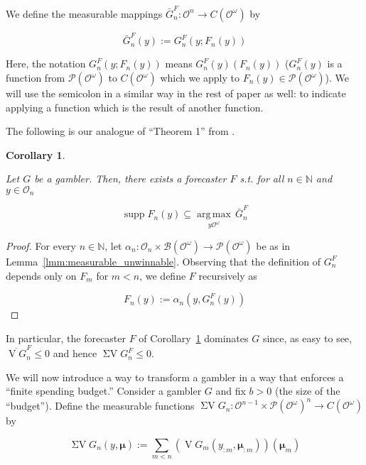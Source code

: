 \documentclass[aop,preprint]{imsart}
\numberwithin{equation}{section}
\theoremstyle{definition}
\theoremstyle{plain}
\newtheorem{corollary}{Corollary}[section]
\newcommand{\Nats}{\mathbb{N}}
\newcommand{\Argmax}[1]{\underset{#1}{\operatorname{arg\,max}}\,}
\newcommand{\PM}{\mathcal{P}}
\DeclareMathOperator{\Sp}{supp}
\newcommand{\Ob}{\mathcal{O}}
\newcommand{\OO}{\Ob^\omega}
\newcommand{\PMO}{\PM(\OO)}
\newcommand{\Gm}{\mathcal{B}}
\newcommand{\GMO}{\Gm(\OO)}
\newcommand{\CO}{C(\OO)}
\DeclareMathOperator{\V}{V}
\DeclareMathOperator{\SV}{\Sigma V}
\newcommand{\BM}{\bm{\mu}}
\begin{document}
We define the measurable mappings $\bar{G}^F_n: \Ob^n \rightarrow \CO$ by

\begin{equation}
\bar{G}^F_n\left(y\right) := G^F_n\left(y;F_n\left(y\right)\right)
\end{equation}

Here, the notation $G^F_n\left(y;F_n\left(y\right)\right)$ means $G^F_n(y)\left(F_n\left(y\right)\right)$ ($G^F_n(y)$ is a function from $\PMO$ to $\CO$ which we apply to $F_n\left(y\right)\in\PMO$). We will use the semicolon in a similar way in the rest of paper as well: to indicate applying a function which is the result of another function.

The following is our analogue of \enquote{Theorem 1} from \cite{Vovk_2005}.

\begin{corollary}
\label{crl:dominate_one}

Let $G$ be a gambler. Then, there exists a forecaster $F$ s.t. for all $n \in \Nats$ and $y \in \Ob_n$

\begin{equation}
\Sp F_n\left(y\right) \subseteq \Argmax{y\OO} \bar{G}^F_n
\end{equation}

\end{corollary}

\begin{proof}

For every $n \in \Nats$, let $\alpha_n: \Ob_n \times \GMO \rightarrow \PMO$ be as in Lemma~\ref{lmm:measurable_unwinnable}. Observing that the definition of $G^F_n$ depends only on $F_m$ for $m < n$, we define $F$ recursively as

\[F_n\left(y\right):=\alpha_n\left(y,G^F_n\left(y\right)\right)\]
\end{proof}

In particular, the forecaster $F$ of Corollary~\ref{crl:dominate_one} dominates $G$ since, as easy to see, $\overline{\V G}^F_n \leq 0$ and hence $\SV G^F_n \leq 0$.

We will now introduce a way to transform a gambler in a way that enforces a \enquote{finite spending budget.} Consider a gambler $G$ and fix $b > 0$ (the size of the \enquote{budget}). Define the measurable functions $\SV G_n: \Ob^{n-1} \times \PMO^n  \rightarrow \CO$ by

\begin{equation}
\SV G_n\left(y,\BM\right) := \sum_{m < n} \left(\V G_m\left(y_{:m},\BM_{:m}\right)\right)\left(\BM_m\right)
\end{equation}
\end{document}
